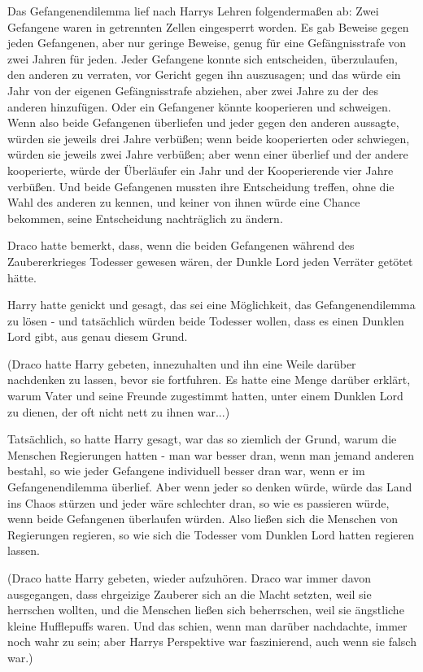 Das Gefangenendilemma lief nach Harrys Lehren folgendermaßen ab: Zwei Gefangene
waren in getrennten Zellen eingesperrt worden. Es gab Beweise gegen jeden
Gefangenen, aber nur geringe Beweise, genug für eine Gefängnisstrafe von zwei
Jahren für jeden. Jeder Gefangene konnte sich entscheiden, überzulaufen, den
anderen zu verraten, vor Gericht gegen ihn auszusagen; und das würde ein Jahr
von der eigenen Gefängnisstrafe abziehen, aber zwei Jahre zu der des anderen
hinzufügen. Oder ein Gefangener könnte kooperieren und schweigen. Wenn also
beide Gefangenen überliefen und jeder gegen den anderen aussagte, würden sie
jeweils drei Jahre verbüßen; wenn beide kooperierten oder schwiegen, würden sie
jeweils zwei Jahre verbüßen; aber wenn einer überlief und der andere
kooperierte, würde der Überläufer ein Jahr und der Kooperierende vier Jahre
verbüßen. Und beide Gefangenen mussten ihre Entscheidung treffen, ohne die Wahl
des anderen zu kennen, und keiner von ihnen würde eine Chance bekommen, seine
Entscheidung nachträglich zu ändern.

Draco hatte bemerkt, dass, wenn die beiden Gefangenen während des
Zaubererkrieges Todesser gewesen wären, der Dunkle Lord jeden Verräter getötet
hätte.

Harry hatte genickt und gesagt, das sei eine Möglichkeit, das Gefangenendilemma
zu lösen - und tatsächlich würden beide Todesser wollen, dass es einen Dunklen
Lord gibt, aus genau diesem Grund.

(Draco hatte Harry gebeten, innezuhalten und ihn eine Weile darüber nachdenken
zu lassen, bevor sie fortfuhren. Es hatte eine Menge darüber erklärt, warum
Vater und seine Freunde zugestimmt hatten, unter einem Dunklen Lord zu dienen,
der oft nicht nett zu ihnen war...)

Tatsächlich, so hatte Harry gesagt, war das so ziemlich der Grund, warum die
Menschen Regierungen hatten - man war besser dran, wenn man jemand anderen
bestahl, so wie jeder Gefangene individuell besser dran war, wenn er im
Gefangenendilemma überlief. Aber wenn jeder so denken würde, würde das Land ins
Chaos stürzen und jeder wäre schlechter dran, so wie es passieren würde, wenn
beide Gefangenen überlaufen würden. Also ließen sich die Menschen von
Regierungen regieren, so wie sich die Todesser vom Dunklen Lord hatten regieren
lassen.

(Draco hatte Harry gebeten, wieder aufzuhören. Draco war immer davon
ausgegangen, dass ehrgeizige Zauberer sich an die Macht setzten, weil sie
herrschen wollten, und die Menschen ließen sich beherrschen, weil sie ängstliche
kleine Hufflepuffs waren. Und das schien, wenn man darüber nachdachte, immer
noch wahr zu sein; aber Harrys Perspektive war faszinierend, auch wenn sie
falsch war.)

